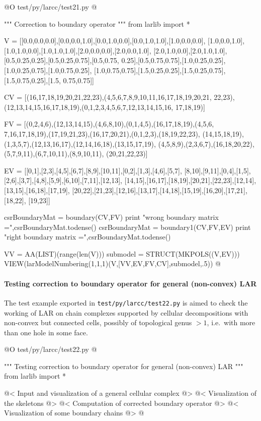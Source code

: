 \documentclass[11pt,oneside]{article}    %
\begin{document}
@O test/py/larcc/test21.py
@{""" Correction to boundary operator """
from larlib import *

V = [[0.0,0.0,0.0],[0.0,0.0,1.0],[0.0,1.0,0.0],[0.0,1.0,1.0],[1.0,0.0,0.0],
[1.0,0.0,1.0],[1.0,1.0,0.0],[1.0,1.0,1.0],[2.0,0.0,0.0],[2.0,0.0,1.0],
[2.0,1.0,0.0],[2.0,1.0,1.0],[0.5,0.25,0.25],[0.5,0.25,0.75],[0.5,0.75,
0.25],[0.5,0.75,0.75],[1.0,0.25,0.25],[1.0,0.25,0.75],[1.0,0.75,0.25],
[1.0,0.75,0.75],[1.5,0.25,0.25],[1.5,0.25,0.75],[1.5,0.75,0.25],[1.5,
0.75,0.75]]

CV = [(16,17,18,19,20,21,22,23),(4,5,6,7,8,9,10,11,16,17,18,19,20,21,
22,23),(12,13,14,15,16,17,18,19),(0,1,2,3,4,5,6,7,12,13,14,15,16,
17,18,19)]

FV = [(0,2,4,6),(12,13,14,15),(4,6,8,10),(0,1,4,5),(16,17,18,19),(4,5,6,
7,16,17,18,19),(17,19,21,23),(16,17,20,21),(0,1,2,3),(18,19,22,23),
(14,15,18,19),(1,3,5,7),(12,13,16,17),(12,14,16,18),(13,15,17,19),
(4,5,8,9),(2,3,6,7),(16,18,20,22),(5,7,9,11),(6,7,10,11),(8,9,10,11),
(20,21,22,23)]

EV = [[0,1],[2,3],[4,5],[6,7],[8,9],[10,11],[0,2],[1,3],[4,6],[5,7],
[8,10],[9,11],[0,4],[1,5],[2,6],[3,7],[4,8],[5,9],[6,10],[7,11],[12,13],
[14,15],[16,17],[18,19],[20,21],[22,23],[12,14],[13,15],[16,18],[17,19],
[20,22],[21,23],[12,16],[13,17],[14,18],[15,19],[16,20],[17,21],[18,22],
[19,23]]

csrBoundaryMat = boundary(CV,FV)
print "wrong boundary matrix =",csrBoundaryMat.todense()
csrBoundaryMat = boundary1(CV,FV,EV)
print "right boundary matrix =",csrBoundaryMat.todense()

VV = AA(LIST)(range(len(V)))
submodel = STRUCT(MKPOLS((V,EV)))
VIEW(larModelNumbering(1,1,1)(V,[VV,EV,FV,CV],submodel,.5)) 
@}

\paragraph{Testing correction to boundary operator for general (non-convex) LAR}

The test example exported in \texttt{test/py/larcc/test22.py} is aimed to check the working of LAR on chain complexes supported by cellular decompositions with non-convex but connected cells, possibly of topological genus $>1$, i.e.~with more than one hole in some face.

@O test/py/larcc/test22.py
@{""" Testing correction to boundary operator for general (non-convex) LAR """
from larlib import *

@< Input and visualization of a general cellular complex @>
@< Visualization of the skeletons @>
@< Computation of corrected boundary operator @>
@< Visualization of some boundary chains @>
@}
\end{document}
